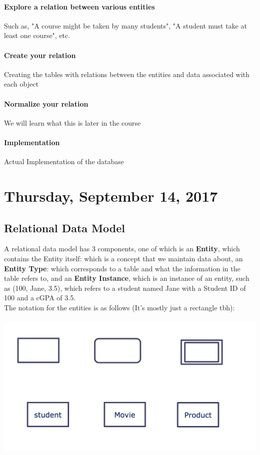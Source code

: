 \documentclass[12pt]{article}
\begin{document}
\paragraph{Explore a relation between various entities} Such as, "A course might be taken by many students", "A student must take at least one course", etc.

\paragraph{Create your relation} Creating the tables with relations between the entities and data associated with each object

\paragraph{Normalize your relation} We will learn what this is later in the course

\paragraph{Implementation} Actual Implementation of the database

\newpage

\section{Thursday, September 14, 2017}

\subsection{Relational Data Model}

A relational data model has 3 components, one of which is an \textbf{Entity}, which contains the Entity itself: which is a concept that we maintain data about, an \textbf{Entity Type}: which corresponds to a table and what the information in the table refers to, and an \textbf{Entity Instance}, which is an instance of an entity, such as (100, Jane, 3.5), which refers to a student named Jane with a Student ID of 100 and a cGPA of 3.5.\\

The notation for the entities is as follows (It's mostly just a rectangle tbh):\\
\\
\includegraphics[scale=0.5]{lec2-1}
\end{document}
